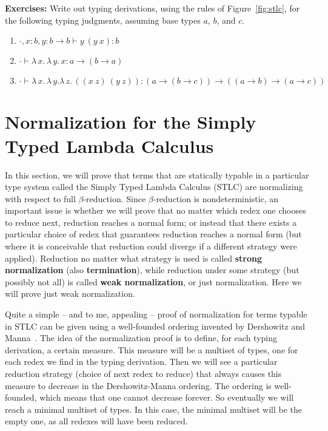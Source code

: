 \documentclass{article}
\begin{document}
\textbf{Exercises:} Write out typing derivations, using the rules of Figure~\ref{fig:stlc}, for
  the following typing judgments, assuming base types $a$, $b$, and $c$.  
  \begin{enumerate}
  \item $\cdot, x:b, y : b\to b \vdash y\ (y\ x) : b$
  \item $\cdot \vdash \lambda\,x.\,\lambda\,y.\,x : a \to (b \to a)$
  \item $\cdot \vdash \lambda\,x.\,\lambda\,y.\lambda\,z.\,((x\ z)\ (y\ z)) : (a \to (b \to c)) \to ((a \to b) \to (a \to c))$
  \end{enumerate}

\section{Normalization for the Simply Typed Lambda Calculus}

In this section, we will prove that terms that are statically typable
in a particular type system called the Simply Typed Lambda Calculus
(STLC) are normalizing with respect to full $\beta$-reduction.  Since
$\beta$-reduction is nondeterministic, an important issue is whether
we will prove that no matter which redex one chooses to reduce next,
reduction reaches a normal form; or instead that there exists a
particular choice of redex that guarantees reduction reaches a normal
form (but where it is conceivable that reduction could diverge if a
different strategy were applied).  Reduction no matter what strategy
is used is called \textbf{strong normalization} (also
\textbf{termination}), while reduction under some strategy (but
possibly not all) is called \textbf{weak normalization}, or just
normalization.  Here we will prove just weak normalization.

Quite a simple -- and to me, appealing -- proof of normalization for
terms typable in STLC can be given using a well-founded ordering
invented by Dershowitz and Manna~\cite{dm79}.  The idea of the
normalization proof is to define, for each typing derivation, a
certain measure.  This measure will be a multiset of types, one for
each redex we find in the typing derivation.  Then we will see a
particular reduction strategy (choice of next redex to reduce) that
always causes this measure to decrease in the Dershowitz-Manna
ordering.  The ordering is well-founded, which means that one cannot
decrease forever.  So eventually we will reach a minimal multiset of
types.  In this case, the minimal multiset will be the empty one, as
all redexes will have been reduced.
\end{document}
